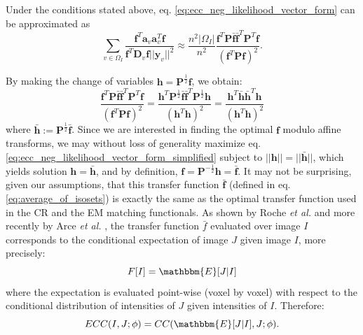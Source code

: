 Under the conditions stated above, eq. \eqref{eq:ecc_neg_likelihood_vector_form} can be approximated as
\begin{equation}
    \sum_{v\in\Omega_{I}}\frac{\mathbf{f}^{T}\mathbf{a}_{v}\mathbf{a}_{v}^{T}\mathbf{f}}
    {\mathbf{f}^{T} \mathbf{D}_{v} \mathbf{f}||\mathbf{y}_{v}||^{2}} \approx
    \frac{n^{2}|\Omega_{I}|}{n^{2}}
    \frac{\mathbf{f}^{T}\mathbf{P}\mathbf{\bar{f}}\mathbf{\bar{f}}^{T}\mathbf{P}^{T}\mathbf{f}}{\left(\mathbf{f}^{T} \mathbf{P} \mathbf{f}\right)^{2}}.
\end{equation}

By making the change of variables $\mathbf{h} = \mathbf{P}^{\frac{1}{2}}\mathbf{f}$, we obtain:
\begin{equation}\label{eq:ecc_neg_likelihood_vector_form_simplified}
    \frac{\mathbf{f}^{T}\mathbf{P}\mathbf{\bar{f}}\mathbf{\bar{f}}^{T}\mathbf{P}^{T}\mathbf{f}}{\left(\mathbf{f}^{T} \mathbf{P} \mathbf{f}\right)^{2}} =
    \frac{\mathbf{h}^{T}\mathbf{P}^{\frac{1}{2}}\mathbf{\bar{f}}\mathbf{\bar{f}}^{T}\mathbf{P}^{\frac{1}{2}}\mathbf{h}} {\left(\mathbf{h}^{T}\mathbf{h}\right)^{2}} =
    \frac{\mathbf{h}^{T}\mathbf{\bar{h}}\mathbf{\bar{h}}^{T}\mathbf{h}} {\left(\mathbf{h}^{T}\mathbf{h}\right)^{2}}
\end{equation}
where $\mathbf{\bar{h}} := \mathbf{P}^{\frac{1}{2}}\mathbf{\bar{f}}$. Since we are interested in finding the optimal $\mathbf{f}$ modulo affine transforms, we may without loss of generality maximize eq. \eqref{eq:ecc_neg_likelihood_vector_form_simplified} subject to $||\mathbf{h}|| = ||\mathbf{\bar{h}}||$, which yields solution $\mathbf{h} = \mathbf{\bar{h}}$, and by definition, $\mathbf{f} = \mathbf{P}^{-\frac{1}{2}}\mathbf{h} = \mathbf{\bar{f}}$. It may not be surprising, given our assumptions, that this transfer function $\mathbf{\bar{f}}$ (defined in eq. \eqref{eq:average_of_isosets}) is exactly the same as the optimal transfer function used in the CR and the EM matching functionals. As shown by Roche {\it et al.} \citep{Roche1998, Roche2000} and more recently by Arce {\it et al.} \cite{Arce-santana2014}, the transfer function $\bar{f}$ evaluated over image $I$ corresponds to the conditional expectation of image $J$ given image $I$, more precisely:
\begin{displaymath}
    F[I] = \mathbbm{E}[J | I]
\end{displaymath}
where the expectation is evaluated point-wise (voxel by voxel) with respect to the conditional distribution of intensities of $J$ given intensities of $I$. Therefore:
\begin{equation}\label{eq:ecc_meaning}
    ECC(I, J; \phi) = CC(\mathbbm{E}[J|I], J ; \phi).
\end{equation}
